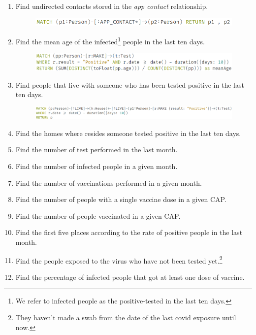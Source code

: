 \begin{enumerate}[leftmargin=*,label=\textbf{\thesection.\arabic*}]
\item Find undirected contacts stored in the \textit{app contact} relationship.
\begin{figure}[h]
    \centering
    \includegraphics[width=\textwidth]{images/find_indirected_app_contacts.png}
\end{figure} 
\item Find the mean age of the infected\footnote{We refer to infected people as the positive-tested in the last ten days.} people in the last ten days.
\begin{figure}[h]
    \centering
    \includegraphics[width=\textwidth]{images/mea_age_last_days.png}
\end{figure} 
\item Find people that live with someone who has been tested positive in the last ten days.
\begin{figure}[h]
    \centering
    \includegraphics[width=\textwidth]{images/mates_of_positive.png}
\end{figure} 
\item Find the homes where resides someone tested positive in the last ten days.
\item Find the number of test performed in the last month.
    \item Find the number of infected people in a given month.
    \item Find the number of vaccinations performed in a given month.
    \item Find the number of people with a single vaccine dose in a given CAP.
    \item Find the number of people vaccinated in a given CAP.
    \item Find the first five places according to the rate of positive people in the last month.
    \item Find the people exposed to the virus who have not been tested yet.\footnote{They haven't made a swab from the date of the last covid exposure until now.} 
    \item Find the percentage of infected people that got at least one dose of vaccine.
\end{enumerate}